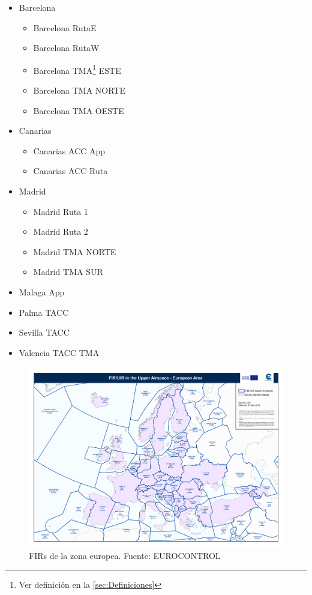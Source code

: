 \begin{itemize}
    \item Barcelona
    \begin{itemize}
        \item Barcelona RutaE
        \item Barcelona RutaW
        \item Barcelona TMA\footnote{Ver definición en la \hyperref[TMA]{\autoref{sec:Definiciones}}} ESTE
        \item Barcelona TMA NORTE
        \item Barcelona TMA OESTE
    \end{itemize}
    \item Canarias
    \begin{itemize}
        \item Canarias ACC App
        \item Canarias ACC Ruta
    \end{itemize}
    \item Madrid
    \begin{itemize}
        \item Madrid Ruta 1
        \item Madrid Ruta 2
        \item Madrid TMA NORTE
        \item Madrid TMA SUR
    \end{itemize}
    \item Malaga App
    \item Palma TACC
    \item Sevilla TACC
    \item  Valencia TACC TMA
\end{itemize}


\begin{figure}[htbp]
    \centering
    \includegraphics[width=\linewidth]{FIR_europa}
    \caption{FIRs de la zona europea. Fuente: EUROCONTROL}
    \label{fig:2:fireuropa}
\end{figure}

